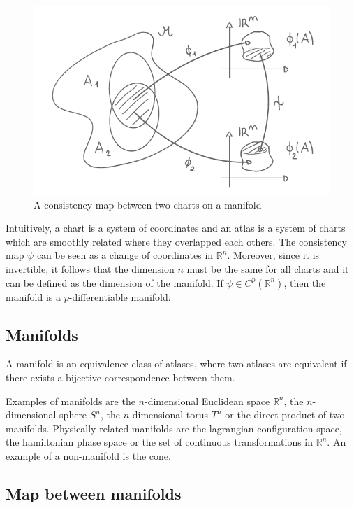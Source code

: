     \begin{figure}[h!]
        \centering
        \includegraphics{consistencymap.pdf}
        \caption{A consistency map between two charts on a manifold}\label{fig:consistency}
    \end{figure}

    \noindent Intuitively, a chart is a system of coordinates and an atlas is a system of charts which are smoothly related where they overlapped each others. The consistency map $\psi$ can be seen as a change of coordinates in $\mathbb R^n$. Moreover, since it is invertible, it follows that the dimension $n$ must be the same for all charts and it can be defined as the dimension of the manifold. If $\psi \in C^p(\mathbb R^n)$, then the manifold is a $p$-differentiable manifold. 

\subsection{Manifolds}

    \begin{definition}[Manifold]
        A manifold is an equivalence class of atlases, where two atlases are equivalent if there exists a bijective correspondence between them.
    \end{definition}
    \noindent Examples of manifolds are the $n$-dimensional Euclidean space $\mathbb R^n$, the $n$-dimensional sphere $S^n$, the $n$-dimensional torus $T^n$ or the direct product of two manifolds. Physically related manifolds are the lagrangian configuration space, the hamiltonian phase space or the set of continuous transformations in $\mathbb R^n$. An example of a non-manifold is the cone.

\subsection{Map between manifolds}

